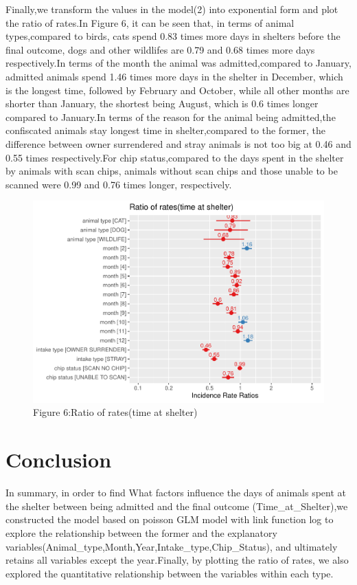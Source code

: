 \documentclass[
]{article}
\begin{document}
Finally,we transform the values in the model(2) into exponential form
and plot the ratio of rates.In Figure 6, it can be seen that, in terms
of animal types,compared to birds, cats spend 0.83 times more days in
shelters before the final outcome, dogs and other wildlifes are 0.79 and
0.68 times more days respectively.In terms of the month the animal was
admitted,compared to January, admitted animals spend 1.46 times more
days in the shelter in December, which is the longest time, followed by
February and October, while all other months are shorter than January,
the shortest being August, which is 0.6 times longer compared to
January.In terms of the reason for the animal being admitted,the
confiscated animals stay longest time in shelter,compared to the former,
the difference between owner surrendered and stray animals is not too
big at 0.46 and 0.55 times respectively.For chip status,compared to the
days spent in the shelter by animals with scan chips, animals without
scan chips and those unable to be scanned were 0.99 and 0.76 times
longer, respectively.

\begin{figure}[H]

{\centering \includegraphics[width=0.68\linewidth]{Group_16_Project_files/figure-latex/unnamed-chunk-9-1} 

}

\caption{\label{fig:box} Figure 6:Ratio of rates(time at shelter)}\label{fig:unnamed-chunk-9}
\end{figure}

\hypertarget{conclusion}{%
\section{Conclusion}\label{conclusion}}

In summary, in order to find What factors influence the days of animals
spent at the shelter between being admitted and the final outcome
(Time\_at\_Shelter),we constructed the model based on poisson GLM model
with link function log to explore the relationship between the former
and the explanatory
variables(Animal\_type,Month,Year,Intake\_type,Chip\_Status), and
ultimately retains all variables except the year.Finally, by plotting
the ratio of rates, we also explored the quantitative relationship
between the variables within each type.
\end{document}
